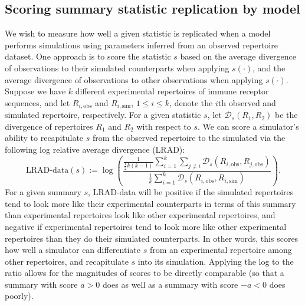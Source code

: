 \documentclass{article}
\begin{document}
\subsection*{Scoring summary statistic replication by model}
We wish to measure how well a given statistic is replicated when a model performs simulations using parameters inferred from an observed repertoire dataset.
One approach is to score the statistic $s$ based on the average divergence of observations to their simulated counterparts when applying $s(\cdot)$, and the average divergence of observations to other observations when applying $s(\cdot)$.
Suppose we have $k$ different experimental repertoires of immune receptor sequences, and let $R_{i, \text{obs}}$ and $R_{i, \text{sim}}$, $1 \le i \le k$, denote the $i$th observed and simulated repertoire, respectively.
For a given statistic $s$, let $\mathcal D_s(R_1, R_2)$ be the divergence of repertoires $R_1$ and $R_2$ with respect to $s$.
We can score a simulator's ability to recapitulate $s$ from the observed repertoire to the simulated via the following log relative average divergence (LRAD):
\begin{equation}\label{eq:ScoreObs}
    \text{LRAD-data}(s) :=
    \log \left(
        \frac{
            \frac{1}{\frac{1}{2} k\left(k - 1\right)}
            \sum_{i=1}^{k}
            \sum_{j \ne i}
                \mathcal D_s\left(R_{i, \text{obs}}, R_{j, \text{obs}}\right)
        }
        {
            \frac{1}{k}
            \sum_{i = 1}^k
                \mathcal D_s \left( R_{i, \text{obs}}, R_{i, \text{sim}} \right)
        }
    \right).
\end{equation}
For a given summary $s$, LRAD-data will be positive if the simulated repertoires tend to look more like their experimental counterparts in terms of this summary than experimental repertoires look like other experimental repertoires, and negative if experimental repertoires tend to look more like other experimental repertoires than they do their simulated counterparts.
In other words, this scores how well a simulator can differentiate $s$ from an experimental repertoire among other repertoires, and recapitulate $s$ into its simulation.
Applying the log to the ratio allows for the magnitudes of scores to be directly comparable (so that a summary with score $a > 0$ does as well as a summary with score $-a < 0$ does poorly).
\end{document}
